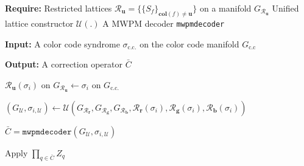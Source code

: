 \documentclass[a4paper,twocolumn,11pt,accepted=2024-12-23]{quantumarticle}
\begin{document}
\begin{algorithm}
    \caption{Unified Decoder}
    \label{alg:ufdecoder}

     \textbf{Require:} \newline Restricted lattices $\mathcal{R}_{\mathbf{u}} = \{ \{S_f \}_{\mathbf{col}(f) \neq \mathbf{u} } \}$ on a manifold $G_{\mathcal{R}_{\mathbf{u}}}$  \newline Unified lattice constructor $\mathcal{U}(.)$ \newline A MWPM decoder \texttt{mwpmdecoder} 
     
    \textbf{Input:} A color code syndrome $\sigma_{\textrm{c.c.}}$ on the color code manifold $G_{\textrm{c.c}}$ 

    \textbf{Output:} A correction operator $\bar{C}$ 

    
    {
    
        {
            {

                $\mathcal{R}_{\mathbf{u}}(\sigma_i) \text{ on } G_{\mathcal{R}_{\mathbf{u}}} \gets \sigma_i \text{ on } G_{\textrm{c.c.}}$
                
            }
        }
    }



    $(G_{\mathcal{U}}, \sigma_{i,\mathcal{U}}) \gets \mathcal{U}\left(
        G_{\mathcal{R}_{\mathbf{r}}}, 
        G_{\mathcal{R}_{\mathbf{g}}}, 
        G_{\mathcal{R}_{\mathbf{b}}},
        \mathcal{R}_{\mathbf{r}}(\sigma_i), 
        \mathcal{R}_{\mathbf{g}}(\sigma_i), 
        \mathcal{R}_{\mathbf{b}}(\sigma_i)
    \right)$


     $ \bar{C} = \texttt{mwpmdecoder}( G_{\mathcal{U}}, \sigma_{i,\mathcal{U}})$
    
    
    Apply $\prod_{q\in\bar{C}} Z_q$

\end{algorithm}
\end{document}
